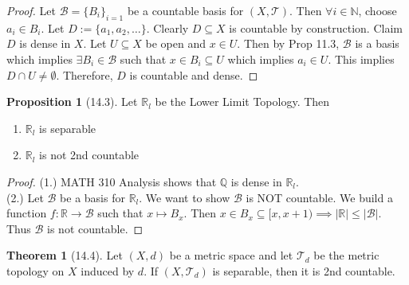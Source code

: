 \documentclass{article}
\newcommand{\R}{\ensuremath{\mathbb{R}}}
\newcommand{\N}{\ensuremath{\mathbb{N}}}
\newcommand{\Q}{\ensuremath{\mathbb{Q}}}
\newcommand{\B}{\ensuremath{\mathcal{B}}}
\newcommand{\tp}{\ensuremath{\mathcal{T}}}
\newcommand{\Ts}[2]{\ensuremath{(#1,#2)}}
\newcommand{\inter}{\cap}
\renewcommand{\Subset}{\subseteq}
\theoremstyle{definition}
\newtheorem*{thm}{Theorem}
\newtheorem*{prop}{Proposition}
\theoremstyle{remark}
\begin{document}
        \begin{proof}
            Let $\B=\{B_i\}_{i=1}$ be a countable basis for $\Ts{X}{\tp}$. Then $\forall i \in \N$, choose $a_i \in B_i$. Let $D := \{a_1,a_2,\ldots\}$. Clearly $D \Subset X$ is countable by construction. Claim $D$ is dense in $X$. Let $U \Subset X$ be open and $x \in U$. Then by Prop 11.3, $\B$ is a basis which implies $\exists B_i \in \B$ such that $x \in B_i \Subset U$ which implies $a_i \in U$. This implies $D \inter U \neq \emptyset$. Therefore, $D$ is countable and dense.
        \end{proof}
        
        \begin{prop}[14.3]
            Let $\R_l$ be the Lower Limit Topology. Then
            \begin{enumerate}
                \item $\R_l$ is separable
                \item $\R_l$ is not 2nd countable
            \end{enumerate}
        \end{prop}
        
        \begin{proof}
            (1.) MATH 310 Analysis shows that $\Q$ is dense in $\R_l$.\\
            (2.) Let $\B$ be a basis for $\R_l$. We want to show $\B$ is NOT countable. We build a function $f:\R \to \B$ such that $x \mapsto B_x$. Then $x \in B_x \Subset [x,x+1) \implies |\R| \leq |\B|$. Thus $\B$ is not countable.
        \end{proof}
        
        \begin{thm}[14.4]
            Let $(X,d)$ be a metric space and let $\tp_d$ be the metric topology on $X$ induced by $d$. If $\Ts{X}{\tp_d}$ is separable, then it is 2nd countable.
        \end{thm}
\end{document}

